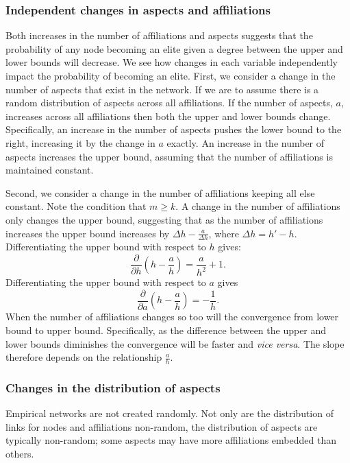 \begin{subappendices}
\subsubsection*{Independent changes in aspects and affiliations}

Both increases in the number of affiliations and aspects suggests that the probability of any node becoming an elite given a degree between the upper and lower bounds will decrease. We see how changes in each variable independently impact the probability of becoming an elite. First, we consider a change in the number of aspects that exist in the network. If we are to assume there is a random distribution of aspects across all affiliations. If the number of aspects, $a$, increases across all affiliations then both the upper and lower bounds change. Specifically, an increase in the number of aspects pushes the lower bound to the right, increasing it by the change in $a$ exactly. An increase in the number of aspects increases the upper bound, assuming that the number of affiliations is maintained constant.

Second, we consider a change in the number of affiliations keeping all else constant. Note the condition that $m \geqslant k$. A change in the number of affiliations only changes the upper bound, suggesting that as the number of affiliations increases the upper bound increases by $\Delta h - \frac{a}{\Delta h}$, where $\Delta h = h' - h$. Differentiating the upper bound with respect to $h$ gives:
\[
\frac{\partial}{\partial h} \left( h - \frac{a}{h} \right) = \frac{a}{h^{2}} + 1 .
\]
Differentiating the upper bound with respect to $a$ gives
\[
\frac{\partial}{\partial a} \left( h - \frac{a}{h} \right) = - \frac{1}{h} .
\]
When the number of affiliations changes so too will the convergence from lower bound to upper bound. Specifically, as the difference between the upper and lower bounds diminishes the convergence will be faster and \emph{vice versa}. The slope therefore depends on the relationship $\frac{a}{h}$.

\subsubsection*{Changes in the distribution of aspects}

Empirical networks are not created randomly. Not only are the distribution of links for nodes and affiliations non-random, the distribution of aspects are typically non-random; some aspects may have more affiliations embedded than others.


\end{subappendices}

